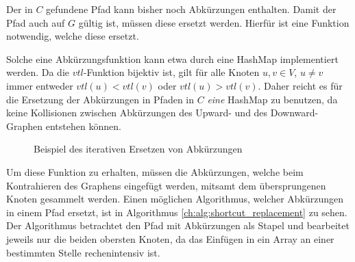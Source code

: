 Der in $C$ gefundene Pfad kann bisher noch Abkürzungen enthalten.
Damit der Pfad auch auf $G$ gültig ist, müssen diese ersetzt werden.
Hierfür ist eine Funktion notwendig, welche diese ersetzt.

Solche eine Abkürzungsfunktion kann etwa durch eine HashMap implementiert werden.
Da die ${vtl}$-Funktion bijektiv ist, gilt für alle Knoten $u, v \in V$, $u \neq v$ immer entweder ${vtl}(u) < {vtl}(v)$ oder ${vtl}(u) > {vtl}(v)$.
Daher reicht es für die Ersetzung der Abkürzungen in Pfaden in $C$ \emph{eine} HashMap zu benutzen, da keine Kollisionen zwischen Abkürzungen des Upward- und des Downward-Graphen entstehen können.

\begin{figure}[ht]
  \centering
  \caption{Beispiel des iterativen Ersetzen von Abkürzungen}
\end{figure}

Um diese Funktion zu erhalten, müssen die Abkürzungen, welche beim Kontrahieren des Graphens eingefügt werden, mitsamt dem übersprungenen Knoten gesammelt werden.
Einen möglichen Algorithmus, welcher Abkürzungen in einem Pfad ersetzt, ist in Algorithmus \ref{ch:alg:shortcut_replacement} zu sehen.
Der Algorithmus betrachtet den Pfad mit Abkürzungen als Stapel und bearbeitet jeweils nur die beiden obersten Knoten, da das Einfügen in ein Array an einer bestimmten Stelle rechenintensiv ist.

